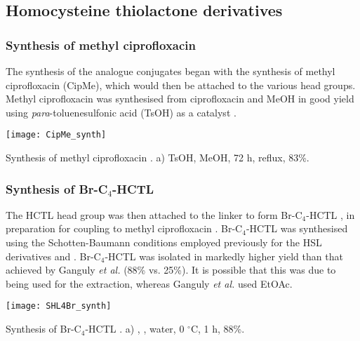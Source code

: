 \subsection{Homocysteine thiolactone derivatives\label{sec:HCTL}}

\subsubsection{Synthesis of methyl ciprofloxacin }

The synthesis of the analogue conjugates began with the synthesis of methyl ciprofloxacin  (CipMe), which would then be attached to the various head groups.
Methyl ciprofloxacin  was synthesised from ciprofloxacin  and MeOH in good yield using \textit{para}-toluenesulfonic acid (TsOH) as a catalyst \cite{Sachin2010}.

\begin{scheme}[H]
	\begin{center}
		\texttt{[image: CipMe\_synth]}
		\caption{Synthesis of methyl ciprofloxacin . a) TsOH, MeOH, 72 h, reflux, 83\%. \label{sch:CipMe_synth}}
	\end{center}
\end{scheme}

\subsubsection{Synthesis of Br-C$_4$-HCTL }

The HCTL head group was then attached to the linker to form Br-C$_4$-HCTL , in preparation for coupling to methyl ciprofloxacin .
Br-C$_4$-HCTL  was synthesised using the Schotten-Baumann conditions employed previously for the HSL derivatives  and . Br-C$_4$-HCTL  was isolated in markedly higher yield than that achieved by Ganguly \textit{et al.}\cite{Ganguly2011} (88\% vs. 25\%). It is possible that this was due to  being used for the extraction, whereas Ganguly \textit{et al.} used EtOAc.

\begin{scheme}[H]
	\begin{center}
		\texttt{[image: SHL4Br\_synth]}
		\caption{Synthesis of Br-C$_4$-HCTL . a) , , water, 0 $^{\circ}$C, 1 h, 88\%.\label{sch:SHL4Br_synth}}
	\end{center}
\end{scheme}

